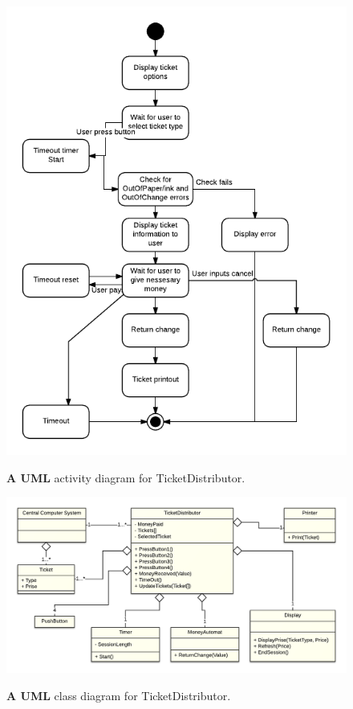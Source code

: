 \documentclass[a4paper]{article}
\begin{document}
	\begin{figure}
		\centering
		\includegraphics[width=1\textwidth]{ActivityDiagram.png}\\
		\caption{\textbf{A UML} activity diagram for TicketDistributor.}
	\end{figure}
	
	\begin{figure}
		\centering
		\includegraphics[width=1\textheight, angle = 270]{ClassDiagram.png}\\
		\caption{\textbf{A UML} class diagram for TicketDistributor.}
	\end{figure}
	
\end{document}
